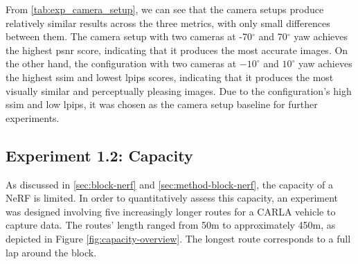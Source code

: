 \begin{comment}
\vspace{0.5cm}

\setlength{\tabcolsep}{12pt}
\renewcommand{\arraystretch}{1.2}
\begin{tabular}{l l}
\multicolumn{2}{c}{\textbf{Experiment setup - constant variables}} \\
\hline
Parameter & Value \\
\hline
Distance  & 125 meters \\
Image resolution &  $600 \times 450$ \\
Ticks per image & 3 \\
Speed & 100\% (default: 30km/h) \\
\hline
\end{tabular}
\caption[Constant parameters for experiment 1.1]{Overview of the values of the parameters that remained constant across the experiments' runs.}
\label{tab:camera-setup-stable-variables}
\end{comment}



From \autoref{tab:exp_camera_setup}, we can see that the camera setups produce relatively similar results across the three metrics, with only small differences between them. The camera setup with two cameras at -70$^{\circ}$ and 70$^{\circ}$ yaw achieves the highest \acrshort{psnr} score, indicating that it produces the most accurate images. On the other hand, the configuration with two cameras at $-10^{\circ}$ and $10^{\circ}$ yaw achieves the highest \acrshort{ssim} and lowest \acrshort{lpips} scores, indicating that it produces the most visually similar and perceptually pleasing images. Due to the configuration's high \acrshort{ssim} and low \acrshort{lpips}, it was chosen as the camera setup baseline for further experiments.











\subsection{Experiment 1.2: Capacity} \label{sec:exp-capacity}
As discussed in \autoref{sec:block-nerf} and \autoref{sec:method-block-nerf}, the capacity of a NeRF is limited. In order to quantitatively assess this capacity, an experiment was designed involving five increasingly longer routes for a CARLA vehicle to capture data. The routes' length ranged from 50m to approximately 450m, as depicted in Figure \ref{fig:capacity-overview}. The longest route corresponds to a full lap around the block.


